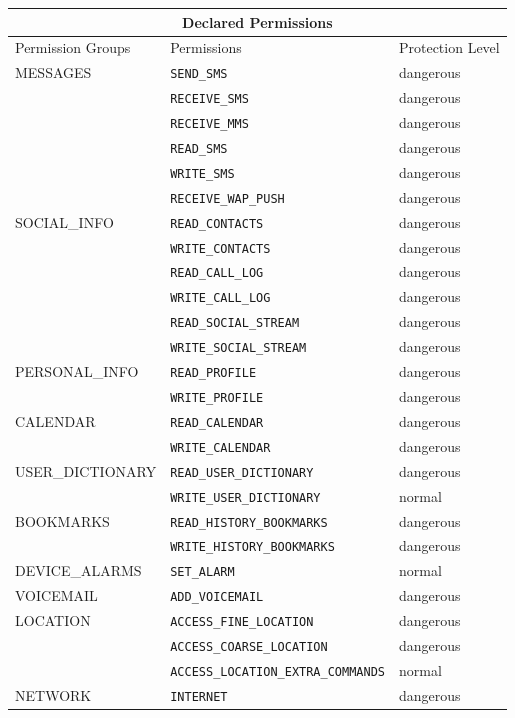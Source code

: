 \documentclass[
  a4paper,  %
  twoside,  %
  bibliography=totoc,
  headsepline,
  cleardoublepage=empty,
  parskip=half,
  draft=false,
  open=any
]{scrbook}
\begin{document}
\begin{longtable}{|p{5cm}|p{6cm}|p{1.7cm}|}
	\hline
	\multicolumn{3}{|c|}{Declared Permissions} \\
	\hline
	Permission Groups & Permissions & Protection Level\\
	\hline\hline
	MESSAGES & \texttt{SEND\_SMS} & dangerous \\
	& \texttt{RECEIVE\_SMS} & dangerous \\
	& \texttt{RECEIVE\_MMS} & dangerous \\
	& \texttt{READ\_SMS} & dangerous \\
	& \texttt{WRITE\_SMS} & dangerous \\
	& \texttt{RECEIVE\_WAP\_PUSH} & dangerous \\
	\hline
	SOCIAL\_INFO & \texttt{READ\_CONTACTS} & dangerous \\
	& \texttt{WRITE\_CONTACTS} & dangerous \\
	& \texttt{READ\_CALL\_LOG} & dangerous \\
	& \texttt{WRITE\_CALL\_LOG} & dangerous \\
	& \texttt{READ\_SOCIAL\_STREAM} & dangerous \\
	& \texttt{WRITE\_SOCIAL\_STREAM} & dangerous \\
	\hline
	PERSONAL\_INFO & \texttt{READ\_PROFILE} & dangerous \\
	& \texttt{WRITE\_PROFILE} & dangerous \\
	\hline
	CALENDAR & \texttt{READ\_CALENDAR} & dangerous \\
	& \texttt{WRITE\_CALENDAR} & dangerous \\
	\hline
	USER\_DICTIONARY & \texttt{READ\_USER\_DICTIONARY} & dangerous \\
	& \texttt{WRITE\_USER\_DICTIONARY} & normal \\
	\hline
	BOOKMARKS & \texttt{READ\_HISTORY\_BOOKMARKS} & dangerous \\
	& \texttt{WRITE\_HISTORY\_BOOKMARKS} & dangerous \\
	\hline
	DEVICE\_ALARMS & \texttt{SET\_ALARM} & normal \\
	\hline
	VOICEMAIL & \texttt{ADD\_VOICEMAIL} & dangerous \\
	\hline
	LOCATION & \texttt{ACCESS\_FINE\_LOCATION} & dangerous \\
	& \texttt{ACCESS\_COARSE\_LOCATION} & dangerous \\
	& \texttt{ACCESS\_LOCATION\_EXTRA\_COMMANDS} & normal \\
	\hline
	NETWORK & \texttt{INTERNET} & dangerous \\

\end{longtable}
\end{document}
